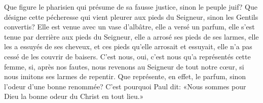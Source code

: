 Que figure le pharisien qui présume de sa fausse justice,
	sinon le peuple juif?
Que désigne cette pécheresse qui vient pleurer aux pieds du Seigneur,
	sinon les Gentils convertis?
Elle est venue avec un vase d'albâtre, elle a versé un parfum,
	elle s'est tenue par derrière aux pieds du Seigneur,
	elle a arrosé ses pieds de ses larmes, elle les a essuyés de ses cheveux,
	et ces pieds qu'elle arrosait et essuyait,
		elle n'a pas cessé de les couvrir de baisers.
C'est nous, oui, c'est nous qu'a représentés cette femme,
	si, après nos fautes, nous revenons au Seigneur de tout notre cœur,
	si nous imitons ses larmes de repentir.
Que représente, en effet, le parfum, sinon l'odeur d'une bonne renommée?
C'est pourquoi Paul dit:
		«Nous sommes pour Dieu la bonne odeur du Christ en tout lieu.»
